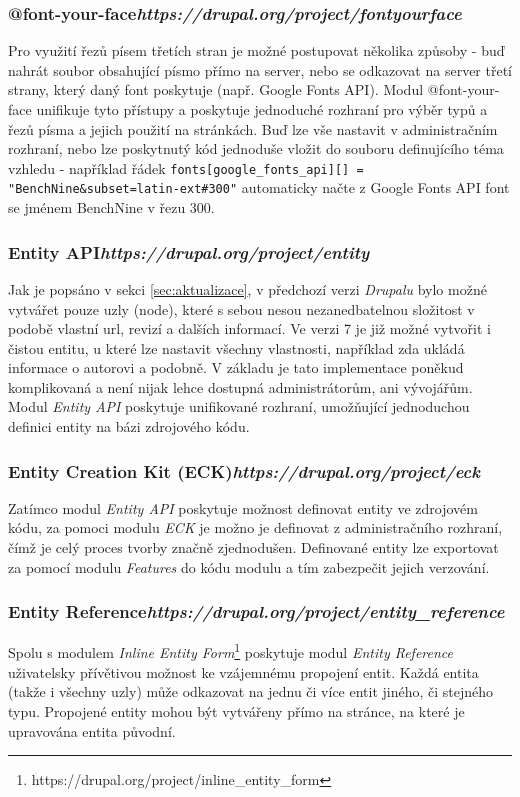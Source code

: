 \subsubsection*{\textbf{@font-your-face}\hfill \emph{https://drupal.org/project/fontyourface}} 
Pro využití řezů písem třetích stran je možné postupovat několika způsoby - buď nahrát soubor obsahující písmo přímo na server, nebo se odkazovat na server třetí strany, který daný font poskytuje (např. Google Fonts API). Modul @font-your-face unifikuje tyto přístupy a poskytuje jednoduché rozhraní pro výběr typů a řezů písma a jejich použití na stránkách. Buď lze vše nastavit v administračním rozhraní, nebo lze poskytnutý kód jednoduše vložit do souboru definujícího téma vzhledu - například řádek \texttt{fonts[google\_fonts\_api][] = "BenchNine\&subset=latin-ext\#300"} automaticky načte z Google Fonts API font se jménem BenchNine v řezu 300.

\subsubsection*{\textbf{Entity API}\hfill \emph{https://drupal.org/project/entity}}
Jak je popsáno v sekci \ref{sec:aktualizace}, v předchozí verzi \emph{Drupalu} bylo možné vytvářet pouze uzly (node), které s sebou nesou nezanedbatelnou složitost v podobě vlastní \gls{url}, revizí a dalších informací. Ve verzi 7 je již možné vytvořit i čistou entitu, u které lze nastavit všechny vlastnosti, například zda ukládá informace o autorovi a podobně. V základu je tato implementace poněkud komplikovaná a není nijak lehce dostupná administrátorům, ani vývojářům. Modul \emph{Entity API} poskytuje unifikované rozhraní, umožňující jednoduchou definici entity na bázi zdrojového kódu\cite{drupal-entities}. 

\subsubsection*{\textbf{Entity Creation Kit} (ECK)\hfill \emph{https://drupal.org/project/eck}} 
Zatímco modul \emph{Entity API} poskytuje možnost definovat entity ve zdrojovém kódu, za pomoci modulu \emph{ECK} je možno je definovat z administračního rozhraní, čímž je celý proces tvorby značně zjednodušen. Definované entity lze exportovat za pomocí modulu \emph{Features} do kódu modulu a tím zabezpečit jejich verzování.

\subsubsection*{\textbf{Entity Reference}\hfill \emph{https://drupal.org/project/entity\_reference}}
Spolu s modulem \emph{Inline Entity Form}\footnote{https://drupal.org/project/inline\_entity\_form} poskytuje modul \emph{Entity Reference} uživatelsky přívětivou možnost ke vzájemnému propojení entit. Každá entita (takže i všechny uzly) může odkazovat na jednu či více entit jiného, či stejného typu. Propojené entity mohou být vytvářeny přímo na stránce, na které je upravována entita původní.

